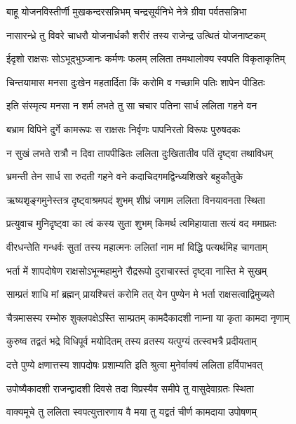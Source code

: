 \twolineshloka
{बाहू योजनविस्तीर्णी मुखकन्दरसन्निभम्}
{चन्द्रसूर्यनिभे नेत्रे ग्रीवा पर्वतसन्निभा} %

\twolineshloka
{नासारन्ध्रे तु विवरे चाधरौ योजनार्धकौ}
{शरीरं तस्य राजेन्द्र उत्थितं योजनाष्टकम्} %

\twolineshloka
{ईदृशो राक्षसः सोऽभूद्भुञ्जानः कर्मणः फलम्}
{ललिता तमथालोक्य स्वपति विकृताकृतिम्} %

\twolineshloka
{चिन्तयामास मनसा दुःखेन महतार्दिता}
{किं करोमि व गच्छामि पतिः शापेन पीडितः} %

\twolineshloka
{इति संस्मृत्य मनसा न शर्म लभते तु सा}
{चचार पतिना सार्ध ललिता गहने वन} %

\twolineshloka
{बभ्राम विपिने दुर्गे कामरूपः स राक्षसः}
{निर्वृणः पापनिरतो विरूपः पुरुषदकः} %

\twolineshloka
{न सुखं लभते रात्रौ न दिवा तापपीडितः}
{ललिता दुःखितातीव पतिं दृष्ट्वा तथाविधम्} %

\twolineshloka
{भ्रमन्ती तेन सार्ध सा रुदती गहने वने}
{कदाचिदगमद्विन्ध्यशिखरे बहुकौतुके} %

\twolineshloka
{ऋष्यशृङ्गमुनेस्तत्र दृष्ट्वाश्रमपदं शुभम्}
{शीघ्रं जगाम ललिता विनयावनता स्थिता} %

\twolineshloka
{प्रत्युवाच मुनिदृष्ट्वा का त्वं कस्य सुता शुभम्}
{किमर्थ त्वमिहायाता सत्यं वद ममाप्रतः} %


\twolineshloka
{वीरधन्तेति गन्धर्वः सुतां तस्य महात्मनः}
{ललितां नाम मां विद्धि पत्यर्थमिह चागताम्} %

\twolineshloka
{भर्ता में शापदोषेण राक्षसोऽभून्महामुने}
{रौद्ररूपो दुराचारस्तं दृष्ट्वा नास्ति मे सुखम्} %

\twolineshloka
{साम्प्रतं शाधि मां ब्रह्मन् प्रायश्चित्तं करोमि तत्}
{येन पुण्येन मे भर्ता राक्षसत्वाद्विमुच्यते} %


\twolineshloka
{चैत्रमासस्य रम्भोरु शुक्लपक्षेऽस्ति साम्प्रतम्}
{कामदैकादशी नाम्ना या कृता कामदा नृणाम्} %

\twolineshloka
{कुरुष्व तद्वतं भद्रे विधिपूर्व मयोदितम्}
{तस्य व्रतस्य यत्पुग्यं तत्स्वभत्रै प्रदीयताम्} %

\twolineshloka
{दत्ते पुण्ये क्षणात्तस्य शापदोषः प्रशाम्यति}
{इति श्रुत्वा मुनेर्वाक्यं ललिता हर्विपाभवत्} %

\twolineshloka
{उपोष्यैकादशी राजन्द्वादशी दिवसे तदा}
{विप्रस्यैव समीपे तु वासुदेवाग्रतः स्थिता} %

\twolineshloka
{वाक्यमूचे तु ललिता स्वपत्युत्तारणाय वै}
{मया तु यद्वतं चीर्ण कामदाया उपोषणम्} %

